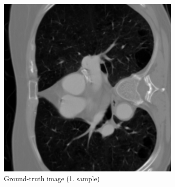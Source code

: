 \documentclass[12pt,a4paper]{article}
\begin{document}
 \begin{figure}[h!] %
    \centering %
    \newcommand\size{0.49}
    \begin{subfigure}[t]{\size\textwidth}
        \centering
        \includegraphics[width=\textwidth]{Bachelorthesis/UsedImages/Train1000_L2_100epochs/Training_L2_1000_100epochs_after10/gt_0_train1000l2100.png}
        \caption{Ground-truth image (1. sample)} %
        \label{fig:windowII+l2+slow+subset_gt0}
    \end{subfigure}
    \hfill %
    \begin{subfigure}[t]{\size\textwidth}
        \centering

\end{subfigure}
\end{figure}
\end{document}

